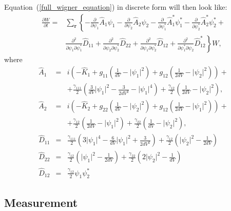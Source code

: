 \documentclass[12pt,notitlepage]{report}
\begin{document}
Equation~(\ref{full_wigner_equation}) in discrete form will then look like:
\begin{equation*}
\begin{split}
\frac{\partial W}{\partial t} = & \sum\limits_{\mathbf{r}} \left\{
	- \frac{\partial}{\partial \psi_1} \hat{A}_1 \psi_1 -
	\frac{\partial}{\partial \psi_2} \hat{A}_2 \psi_2 -
	\frac{\partial}{\partial \psi^*_1} \hat{A}^*_1 \psi^*_1 -
	\frac{\partial}{\partial \psi^*_2} \hat{A}^*_2 \psi^*_2 +
\right. \\
& \left.
	\frac{\partial^2}{\partial \psi_1 \partial \psi_1^*} \hat{D}_{11} +
	\frac{\partial^2}{\partial \psi_2 \partial \psi_2^*} \hat{D}_{22} +
	\frac{\partial^2}{\partial \psi_1 \partial \psi_2^*} \hat{D}_{12} +
	\frac{\partial^2}{\partial \psi_1^* \partial \psi_2} \hat{D}^*_{12}
\right\} W,
\end{split}
\end{equation*}
where
\begin{eqnarray*}
\hat{A}_1 & = & i \left( - \hat{K}_1 + g_{11} \left( \frac{1}{dV} - \lvert \psi_1 \rvert^2 \right) +
g_{12} \left( \frac{1}{2 dV} - \lvert \psi_2 \rvert^2 \right) \right) + \\
& & +\frac{\gamma_{111}}{2} \left( \frac{3}{dV} \lvert \psi_1 \rvert^2 - \frac{3}{2 dV^2} - \lvert \psi_1 \rvert^4 \right) +
\frac{\gamma_{12}}{2} \left( \frac{1}{2 dV} - \lvert \psi_2 \rvert^2 \right), \\
\hat{A}_2 & = & i \left( - \hat{K}_2 + g_{22} \left( \frac{1}{dV} - \lvert \psi_2 \rvert^2 \right) +
g_{12} \left( \frac{1}{2 dV} - \lvert \psi_1 \rvert^2 \right) \right) + \\
& & + \frac{\gamma_{12}}{2} \left( \frac{1}{2 dV} - \lvert \psi_1 \rvert^2 \right) +
\frac{\gamma_{22}}{2} \left( \frac{1}{dV} - \lvert \psi_2 \rvert^2 \right), \\
\hat{D}_{11} & = & \frac{\gamma_{111}}{2} \left(3 \lvert \psi_1 \rvert^4 -
\frac{6}{dV} \lvert \psi_1 \rvert^2 + \frac{3}{2 dV^2} \right) + \frac{\gamma_{12}}{2} \left( \lvert \psi_2 \rvert^2 - \frac{1}{2 dV} \right) \\
\hat{D}_{22} & = & \frac{\gamma_{12}}{2} \left( \lvert \psi_1 \rvert^2 - \frac{1}{2 dV} \right) +
\frac{\gamma_{22}}{2} \left( 2 \lvert \psi_2 \rvert^2 - \frac{1}{dV} \right) \\
\hat{D}_{12} & = & \frac{\gamma_{12}}{2} \psi_1 \psi_2^*
\end{eqnarray*}

\subsection*{Measurement}
\end{document}
